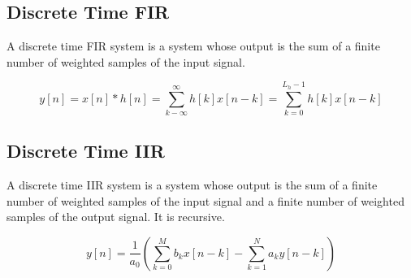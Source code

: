 \documentclass[letterpaper]{article}
\newcommand{\divline}{\noindent\makebox[\linewidth]{\rule{\textwidth}{0.4pt}}}
\begin{document}
\begin{multicols}{2}
        \subsection{Discrete Time FIR}

        A discrete time FIR system is a system whose output is the sum of a finite number of weighted samples of the input signal.

        \[y[n] = x[n] * h[n] = \sum_{k-\infty}^{\infty} h[k]x[n-k] = \sum_{k=0}^{L_h - 1} h[k]x[n-k]\]

        \subsection{Discrete Time IIR}

        A discrete time IIR system is a system whose output is the sum of a finite number of weighted samples of the input signal and a finite number of weighted samples of the output signal. It is recursive.

        \[y[n] = \frac{1}{a_0} \left( \sum_{k=0}^{M} b_k x[n-k] - \sum_{k=1}^{N} a_k y[n-k] \right)\]

    \end{multicols}

    \divline
\end{document}
